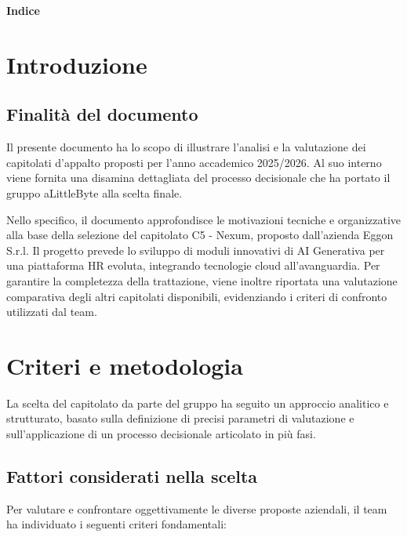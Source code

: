 \documentclass[a4paper,12pt]{article}
\begin{document}
\newpage

\begin{center} 
    {\Large \textbf{Indice}}
\end{center}

\vspace{0.6cm}

\tableofcontents

\newpage

\section{Introduzione}
\subsection{Finalità del documento}

Il presente documento ha lo scopo di illustrare l'analisi e la valutazione dei capitolati d'appalto proposti per l'anno accademico 2025/2026. Al suo interno viene fornita una disamina dettagliata del processo decisionale che ha portato il gruppo aLittleByte alla scelta finale.

Nello specifico, il documento approfondisce le motivazioni tecniche e organizzative alla base della selezione del capitolato C5 - Nexum, proposto dall'azienda Eggon S.r.l. Il progetto prevede lo sviluppo di moduli innovativi di AI Generativa per una piattaforma HR evoluta, integrando tecnologie cloud all'avanguardia. Per garantire la completezza della trattazione, viene inoltre riportata una valutazione comparativa degli altri capitolati disponibili, evidenziando i criteri di confronto utilizzati dal team.

\section{Criteri e metodologia}

La scelta del capitolato da parte del gruppo ha seguito un approccio analitico e strutturato, basato sulla definizione di precisi parametri di valutazione e sull'applicazione di un processo decisionale articolato in più fasi.

\subsection{Fattori considerati nella scelta}

Per valutare e confrontare oggettivamente le diverse proposte aziendali, il team ha individuato i seguenti criteri fondamentali:
\end{document}
